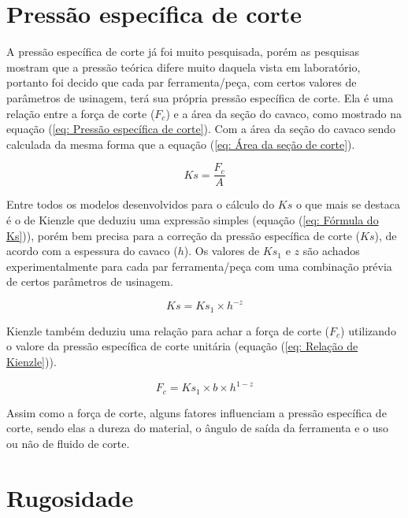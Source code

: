 \documentclass[deposito, acronym, symbols]{fei}
\begin{document}
 \section{Pressão específica de corte}
 
A pressão específica de corte já foi muito pesquisada, porém as pesquisas mostram que a pressão teórica difere muito daquela vista em laboratório, portanto foi decido que cada par ferramenta/peça, com certos valores de parâmetros de usinagem, terá sua própria pressão específica de corte. Ela é uma relação entre a força de corte ($F_c$) e a área da seção do cavaco, como mostrado na equação (\ref{eq: Pressão específica de corte}). Com a área da seção do cavaco sendo calculada da mesma forma que a equação (\ref{eq: Área da seção de corte}). 


\begin{equation}
    Ks=\frac{F_c}{A}
    \label{eq: Pressão específica de corte}
\end{equation}



Entre todos os modelos desenvolvidos para o cálculo do $Ks$ o que mais se destaca é o de Kienzle que deduziu uma expressão simples (equação (\ref{eq: Fórmula do Ks})), porém bem precisa para a correção da pressão específica de corte ($Ks$), de acordo com a espessura do cavaco ($h$). Os valores de $Ks_1$ e $z$ são achados experimentalmente para cada par ferramenta/peça com uma combinação prévia de certos parâmetros de usinagem. 


\begin{equation}
    Ks=Ks_1\times{h^{-z}}
    \label{eq: Fórmula do Ks}
\end{equation}

Kienzle também deduziu uma relação para achar a força de corte ($F_c$) utilizando o valore da pressão específica de corte unitária (equação (\ref{eq: Relação de Kienzle})).

\begin{equation}
    F_c=Ks_1\times{b}\times{h^{1-z}}
    \label{eq: Relação de Kienzle}
\end{equation}

Assim como a força de corte, alguns fatores influenciam a pressão específica de corte, sendo elas a dureza do material, o ângulo de saída da ferramenta e o uso ou não de fluido de corte.


\section{Rugosidade}
\end{document}
